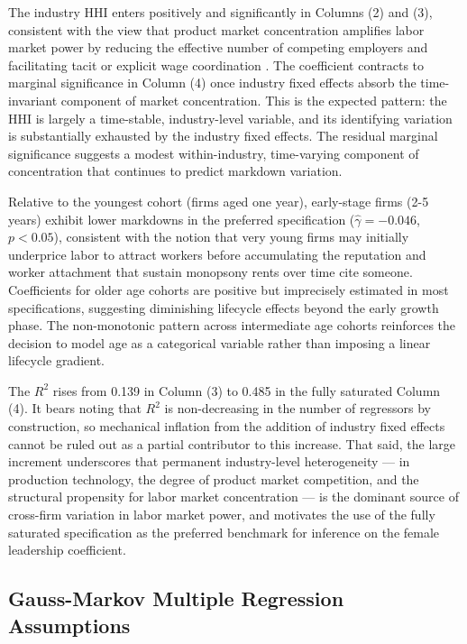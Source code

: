 \documentclass[12pt]{article}
\begin{document}
The industry HHI enters positively and significantly in Columns (2) and (3), consistent with the view that product market concentration amplifies labor market power by reducing the effective number of competing employers and facilitating tacit or explicit wage coordination \parencite{azar_labor_2017,berger_labor_2022}. The coefficient contracts to marginal significance in Column (4) once industry fixed effects absorb the time-invariant component of market concentration. This is the expected pattern: the HHI is largely a time-stable, industry-level variable, and its identifying variation is substantially exhausted by the industry fixed effects. The residual marginal significance suggests a modest within-industry, time-varying component of concentration that continues to predict markdown variation.

Relative to the youngest cohort (firms aged one year), early-stage firms (2-5 years) exhibit lower markdowns in the preferred specification ($\hat{\gamma} = -0.046$, $p < 0.05$), consistent with the notion that very young firms may initially underprice labor to attract workers before accumulating the reputation and worker attachment that sustain monopsony rents over time cite someone. Coefficients for older age cohorts are positive but imprecisely estimated in most specifications, suggesting diminishing lifecycle effects beyond the early growth phase. The non-monotonic pattern across intermediate age cohorts reinforces the decision to model age as a categorical variable rather than imposing a linear lifecycle gradient.

The $R^2$ rises from 0.139 in Column (3) to 0.485 in the fully saturated Column (4). It bears noting that $R^2$ is non-decreasing in the number of regressors by construction, so mechanical inflation from the addition of industry fixed effects cannot be ruled out as a partial contributor to this increase. That said, the large increment underscores that permanent industry-level heterogeneity — in production technology, the degree of product market competition, and the structural propensity for labor market concentration — is the dominant source of cross-firm variation in labor market power, and motivates the use of the fully saturated specification as the preferred benchmark for inference on the female leadership coefficient.

\subsection{Gauss-Markov Multiple Regression Assumptions}
\end{document}
